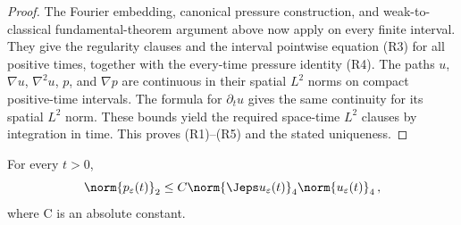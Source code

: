\documentclass[11pt,reqno]{amsart}
\begin{document}
\begin{proof}
The Fourier embedding, canonical pressure construction, and weak-to-classical
fundamental-theorem argument above now apply on every finite interval. They
give the regularity clauses and the interval pointwise equation (R3) for all
positive times, together with the every-time pressure identity (R4). The
paths $u$, $\nabla u$, $\nabla^2u$, $p$, and $\nabla p$ are continuous
in their spatial $L^2$ norms on compact positive-time intervals. The formula
for $\partial_tu$ gives the same continuity for its spatial $L^2$ norm.
These bounds yield the required space-time $L^2$ clauses by integration in
time.
This proves (R1)--(R5) and the stated uniqueness.
\end{proof}

\begin{lemma}\label{lem:reg-pressure-L2}
For every $t>0$,
\begin{equation}\label{eq:reg-pressure-L2}
  \norm{p_\varepsilon(t)}_2\le C\norm{\Jeps u_\varepsilon(t)}_4
    \norm{u_\varepsilon(t)}_4\,,
\end{equation}
where C is an absolute constant.
\end{lemma}
\end{document}
